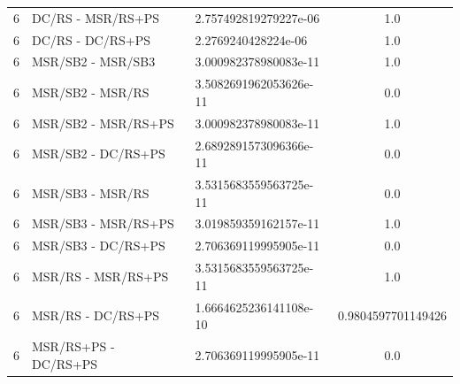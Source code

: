 \documentclass[10pt,a4paper]{article}
\begin{document}
\begin{longtable}{c l l c}
6 & DC/RS - MSR/RS+PS & 2.757492819279227e-06 & 1.0 \\
6 & DC/RS - DC/RS+PS & 2.2769240428224e-06 & 1.0 \\
6 & MSR/SB2 - MSR/SB3 & 3.000982378980083e-11 & 1.0 \\
6 & MSR/SB2 - MSR/RS & 3.5082691962053626e-11 & 0.0 \\
6 & MSR/SB2 - MSR/RS+PS & 3.000982378980083e-11 & 1.0 \\
6 & MSR/SB2 - DC/RS+PS & 2.6892891573096366e-11 & 0.0 \\
6 & MSR/SB3 - MSR/RS & 3.5315683559563725e-11 & 0.0 \\
6 & MSR/SB3 - MSR/RS+PS & 3.019859359162157e-11 & 1.0 \\
6 & MSR/SB3 - DC/RS+PS & 2.706369119995905e-11 & 0.0 \\
6 & MSR/RS - MSR/RS+PS & 3.5315683559563725e-11 & 1.0 \\
6 & MSR/RS - DC/RS+PS & 1.6664625236141108e-10 & 0.9804597701149426 \\
6 & MSR/RS+PS - DC/RS+PS & 2.706369119995905e-11 & 0.0 \\
\end{longtable}
\end{document}
